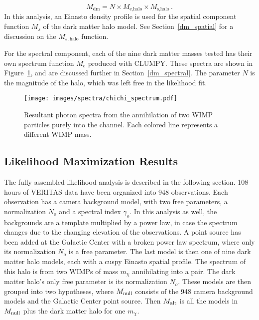 \begin{equation}\label{eqn:dmmodel}
  M_{\textrm{dm}} = N \times M_{\textrm{e,halo}} \times M_{\textrm{s,halo}} \,.
\end{equation}
In this analysis, an Einasto density profile is used for the spatial component function $M_s$ of the dark matter halo model.
See Section~\ref{dm_spatial} for a discussion on the $M_{s,\textrm{halo}}$ function.

For the spectral component, each of the nine dark matter masses tested has their own spectrum function $M_e$ produced with CLUMPY.
These spectra are shown in Figure~\ref{fig:chichi_spectrum2}, and are discussed further in Section~\ref{dm_spectral}.
The parameter $N$ is the magnitude of the halo, which was left free in the likelihood fit.

\begin{figure}[bt]
  \centering
  \texttt{[image: images/spectra/chichi\_spectrum.pdf]}
  \caption[Single Annihilation Spectra]{
    Resultant photon spectra from the annihilation of two WIMP particles purely into the \bbbar channel.
    Each colored line represents a different WIMP mass.
  }
  \label{fig:chichi_spectrum2}
\end{figure}

\FloatBarrier

\subsection{Likelihood Maximization Results}\label{like_results}

The fully assembled likelihood analysis is described in the following section.
108 hours of VERITAS data have been organized into 948 observations.
Each observation has a camera background model, with two free parameters, a normalization $N_o$ and a spectral index $\gamma_o$.
In this analysis as well, the backgrounds are a template multiplied by a power law, in case the spectrum changes due to the changing elevation of the observations.
A point source has been added at the Galactic Center with a broken power law spectrum, where only its normalization $N_o$ is a free parameter.
The last model is then one of nine dark matter halo models, each with a cuspy Einasto spatial profile.
The spectrum of this halo is from two WIMPs of mass $m_{\chi}$ annihilating into a \bbbar pair.
The dark matter halo's only free parameter is its normalization $N_o$.
These models are then grouped into two hypotheses, where $M_\textrm{null}$ consists of the 948 camera background models and the Galactic Center point source.
Then $M_\textrm{alt}$ is all the models in $M_\textrm{null}$ plus the dark matter halo for one $m_{\chi}$.
  
